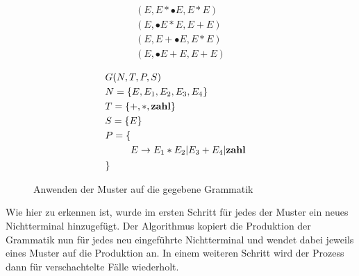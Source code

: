 \documentclass[runningheads]{llncs}
\begin{document}
    \begin{figure}
        \begin{minipage}{0.48\textwidth}
            \begin{flushleft}
                \begin{align*}
                (E, E*\bullet{E}, E*E)
                    \\
                    (E, \bullet{E}*E, E+E) \\
                    (E, E+\bullet{E}, E*E) \\
                    (E, \bullet{E}+E, E+E)
                \end{align*}
            \end{flushleft}
        \end{minipage}
        \hfill
        \begin{minipage}{0.48\textwidth}
            \begin{align*}
                & G(N,T,P,S) \\
                & N = \{E, E_1, E_2, E_3, E_4\} \\
                & T = \{+, *, \bold{zahl}\} \\
                & S = \{E\} \\
                & P = \{ \begin{aligned}[t]
                             \\
                             E &\rightarrow E_1 * E_2 | E_3 + E_4 | \bold{zahl} \\
                \end{aligned} \\
                & \}
            \end{align*}
        \end{minipage}
        \caption{Anwenden der Muster auf die gegebene Grammatik}
        \label{fig:figure8}
    \end{figure}

    Wie hier zu erkennen ist, wurde im ersten Schritt für jedes der Muster ein neues Nichtterminal hinzugefügt.
    Der Algorithmus kopiert die Produktion der Grammatik nun für jedes neu eingeführte Nichtterminal
    und wendet dabei jeweils eines Muster auf die Produktion an.
    In einem weiteren Schritt wird der Prozess dann für verschachtelte Fälle wiederholt.
\end{document}
